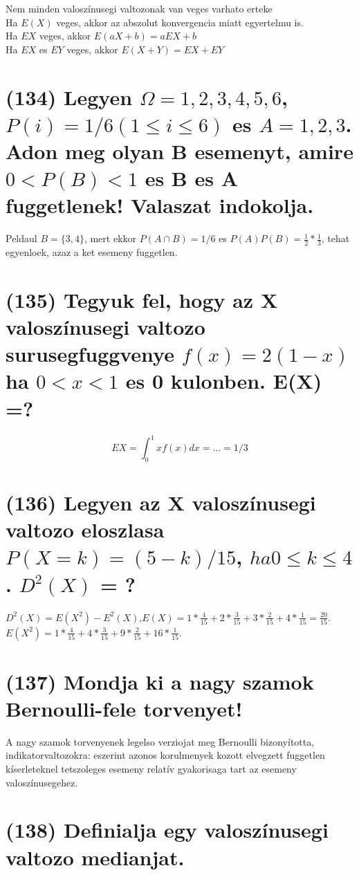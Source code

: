 \documentclass[12p]{article}
\begin{document}
Nem minden valoszínusegi valtozonak van veges varhato erteke\\
Ha $E(X)$ veges, akkor az abszolut konvergencia miatt egyertelmu is.\\
Ha $EX$ veges, akkor $E(aX+b)=aEX+b$\\
Ha $EX$ es $EY$ veges, akkor $E(X+Y)=EX+EY$

\section{(134) Legyen $\Omega = {1, 2, 3, 4, 5, 6}$, $P(i) = 1/6 (1 \leq i \leq 6)$ es $A = {1, 2, 3}$. Adon meg olyan B
esemenyt, amire $0 < P(B) < 1$ es B es A fuggetlenek! Valaszat indokolja.}

 Peldaul $B = \{3, 4\}$, mert ekkor $P(A \cap B) = 1/6$ es $P(A)P(B) = \frac{1}{2} * \frac{1}{3}$, tehat egyenloek, azaz a ket esemeny fuggetlen.

\section{(135) Tegyuk fel, hogy az X valoszínusegi valtozo surusegfuggvenye $f(x) = 2(1-x)$ ha $0 < x < 1$ es 0 kulonben. E(X) =? }

$$EX = \int^1_0 xf(x)dx = ... = 1/3$$

\section{(136) Legyen az X valoszínusegi valtozo eloszlasa $P(X = k) = (5 - k)/15$, $ha 0 \leq k \leq 4$. $D^2(X)$ = ?}

$D^2(X) = E(X^2) - E^2(X)$,$E(X) = 1 * \frac{4}{15} + 2 * \frac{3}{15} + 3 * \frac{2}{15} + 4 * \frac{1}{15} = \frac{20}{15}$.\\
$E(X^2) = 1 * \frac{4}{15} + 4 * \frac{3}{15} + 9 * \frac{2}{15} + 16 * \frac{1}{15}$.

\section{(137) Mondja ki a nagy szamok Bernoulli-fele torvenyet!}

A nagy szamok torvenyenek legelso verziojat
meg Bernoulli bizonyította,
indikatorvaltozokra: eszerint azonos
korulmenyek kozott elvegzett fuggetlen
kíserleteknel tetszoleges esemeny relatív
gyakorisaga tart az esemeny
valoszínusegehez.

\section{(138) Definialja egy valoszínusegi valtozo medianjat.}
\end{document}
